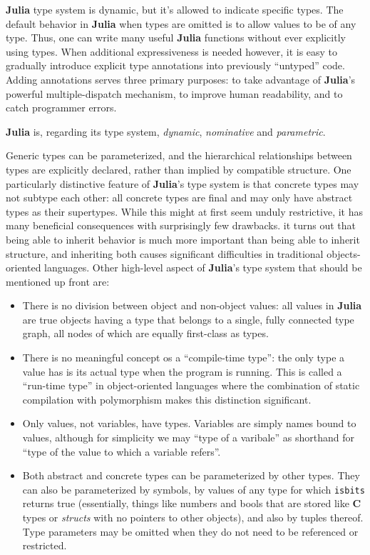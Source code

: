\documentclass[
]{article}
\providecommand{\tightlist}{%
  \setlength{\itemsep}{0pt}\setlength{\parskip}{0pt}}
\begin{document}
\textbf{Julia} type system is dynamic, but it's allowed to indicate
specific types. The default behavior in \textbf{Julia} when types are
omitted is to allow values to be of any type. Thus, one can write many
useful \textbf{Julia} functions without ever explicitly using types.
When additional expressiveness is needed however, it is easy to
gradually introduce explicit type annotations into previously
``untyped'' code. Adding annotations serves three primary purposes: to
take advantage of \textbf{Julia}'s powerful multiple-dispatch mechanism,
to improve human readability, and to catch programmer errors.

\textbf{Julia} is, regarding its type system, \emph{dynamic},
\emph{nominative} and \emph{parametric}.

Generic types can be parameterized, and the hierarchical relationships
between types are explicitly declared, rather than implied by compatible
structure. One particularly distinctive feature of \textbf{Julia}'s type
system is that concrete types may not subtype each other: all concrete
types are final and may only have abstract types as their supertypes.
While this might at first seem unduly restrictive, it has many
beneficial consequences with surprisingly few drawbacks. it turns out
that being able to inherit behavior is much more important than being
able to inherit structure, and inheriting both causes significant
difficulties in traditional objects-oriented languages. Other high-level
aspect of \textbf{Julia}'s type system that should be mentioned up front
are:

\begin{itemize}
\tightlist
\item
  There is no division between object and non-object values: all values
  in \textbf{Julia} are true objects having a type that belongs to a
  single, fully connected type graph, all nodes of which are equally
  first-class as types.
\item
  There is no meaningful concept os a ``compile-time type'': the only
  type a value has is its actual type when the program is running. This
  is called a ``run-time type'' in object-oriented languages where the
  combination of static compilation with polymorphism makes this
  distinction significant.
\item
  Only values, not variables, have types. Variables are simply names
  bound to values, although for simplicity we may ``type of a varibale''
  as shorthand for ``type of the value to which a variable refers''.
\item
  Both abstract and concrete types can be parameterized by other types.
  They can also be parameterized by symbols, by values of any type for
  which \texttt{isbits} returns true (essentially, things like numbers
  and bools that are stored like \textbf{C} types or \emph{structs} with
  no pointers to other objects), and also by tuples thereof. Type
  parameters may be omitted when they do not need to be referenced or
  restricted.
\end{itemize}
\end{document}
